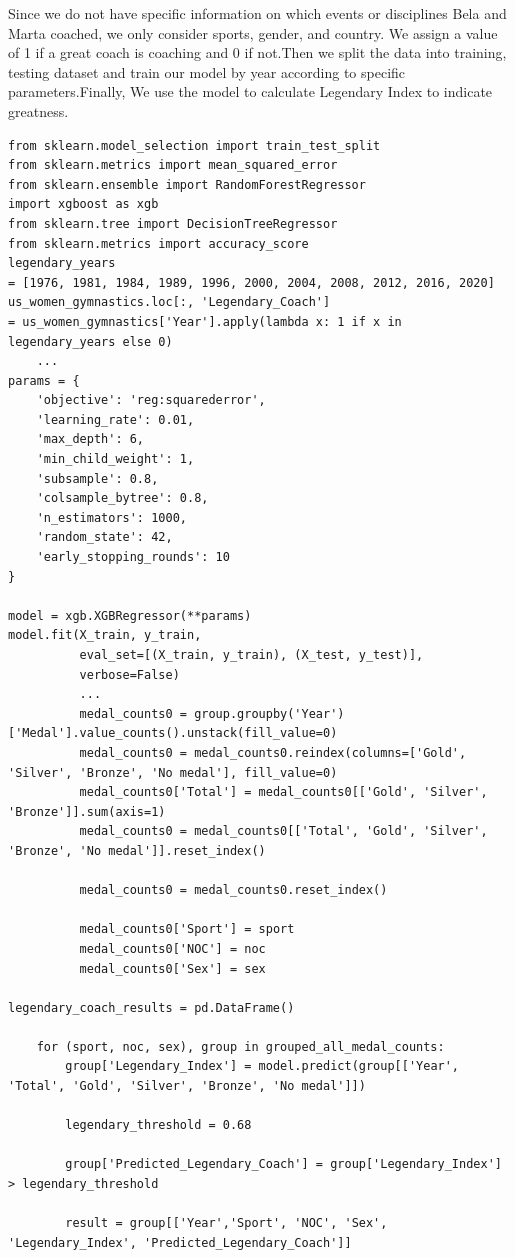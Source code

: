 Since we do not have specific information on which events or disciplines Bela and Marta coached, we only consider sports, gender, and country. We assign a value of 1 if a great coach is coaching and 0 if not.Then we split the data into training, testing dataset and train our model by year according to specific parameters.Finally, We use the model to calculate Legendary Index to indicate greatness.\cite{johnson2022machine}

\begin{lstlisting}[caption=Part of the Model]
from sklearn.model_selection import train_test_split
from sklearn.metrics import mean_squared_error
from sklearn.ensemble import RandomForestRegressor
import xgboost as xgb
from sklearn.tree import DecisionTreeRegressor
from sklearn.metrics import accuracy_score
legendary_years 
= [1976, 1981, 1984, 1989, 1996, 2000, 2004, 2008, 2012, 2016, 2020]
us_women_gymnastics.loc[:, 'Legendary_Coach'] 
= us_women_gymnastics['Year'].apply(lambda x: 1 if x in legendary_years else 0)
    ...
params = {
    'objective': 'reg:squarederror',
    'learning_rate': 0.01,
    'max_depth': 6,
    'min_child_weight': 1,
    'subsample': 0.8,
    'colsample_bytree': 0.8,
    'n_estimators': 1000,
    'random_state': 42,
    'early_stopping_rounds': 10
}

model = xgb.XGBRegressor(**params)
model.fit(X_train, y_train,
          eval_set=[(X_train, y_train), (X_test, y_test)], 
          verbose=False) 
          ...
          medal_counts0 = group.groupby('Year')['Medal'].value_counts().unstack(fill_value=0)
          medal_counts0 = medal_counts0.reindex(columns=['Gold', 'Silver', 'Bronze', 'No medal'], fill_value=0)
          medal_counts0['Total'] = medal_counts0[['Gold', 'Silver', 'Bronze']].sum(axis=1)
          medal_counts0 = medal_counts0[['Total', 'Gold', 'Silver', 'Bronze', 'No medal']].reset_index()
         
          medal_counts0 = medal_counts0.reset_index()
          
          medal_counts0['Sport'] = sport
          medal_counts0['NOC'] = noc
          medal_counts0['Sex'] = sex
          
legendary_coach_results = pd.DataFrame()

    for (sport, noc, sex), group in grouped_all_medal_counts:
        group['Legendary_Index'] = model.predict(group[['Year', 'Total', 'Gold', 'Silver', 'Bronze', 'No medal']])
              
        legendary_threshold = 0.68
            
        group['Predicted_Legendary_Coach'] = group['Legendary_Index'] > legendary_threshold
              
        result = group[['Year','Sport', 'NOC', 'Sex', 'Legendary_Index', 'Predicted_Legendary_Coach']]
          
\end{lstlisting}

